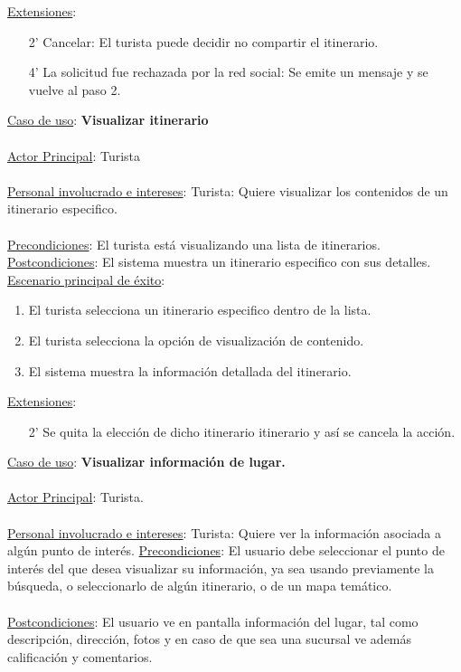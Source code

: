\documentclass[12pt]{article}
\begin{document}
\underline{Extensiones}:
\begin{enumerate}
\item[2'] Cancelar: El turista puede decidir no compartir el itinerario.
\item[4'] La solicitud fue rechazada por la red social: Se emite un mensaje y se vuelve al paso 2.
\end{enumerate}
\underline{Caso de uso}: \textbf{Visualizar itinerario}\\\\
\underline{Actor Principal}: Turista\\\\
\underline{Personal involucrado e intereses}: Turista: Quiere visualizar los contenidos de un itinerario especifico.\\\\
\underline{Precondiciones}:  El turista está visualizando una lista de itinerarios. 
\underline{Postcondiciones}: El sistema muestra un itinerario especifico con sus detalles.
\underline{Escenario principal de éxito}:
\begin{enumerate}
\item El turista selecciona un itinerario especifico dentro de la lista.
\item El turista selecciona la opción de visualización de contenido.
\item El sistema muestra la información detallada del itinerario.
\end{enumerate}
\underline{Extensiones}:
\begin{enumerate}
\item[2'] Se quita la elección de dicho itinerario itinerario y así se cancela la acción.
\end{enumerate}
\underline{Caso de uso}: \textbf{Visualizar información de lugar.}\\\\
\underline{Actor Principal}: Turista.\\\\
\underline{Personal involucrado e intereses}: Turista: Quiere ver la información asociada a algún punto de interés.
\underline{Precondiciones}: El usuario debe seleccionar el punto de interés del que desea visualizar su información, ya sea usando previamente la búsqueda, o seleccionarlo de algún itinerario, o de un mapa temático.\\\\
\underline{Postcondiciones}: El usuario ve en pantalla información del lugar, tal como descripción, dirección, fotos y en caso de que sea una sucursal ve además calificación y comentarios.\\\\
\end{document}
